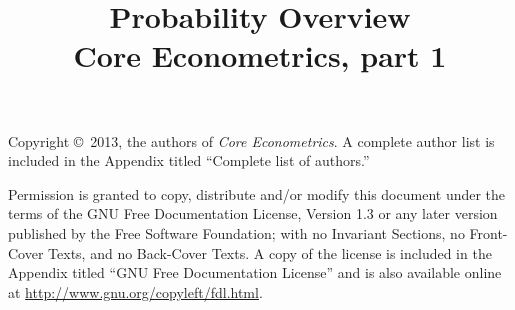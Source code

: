 \documentclass[nohyper]{tufte-handout}
\title[Probability overview]%
{Probability Overview \\
  Core Econometrics, part 1}
\begin{document}
\maketitle

\bigskip\noindent%
Copyright \copyright\ 2013, the authors of \textit{Core Econometrics}.  A
complete author list is included in the Appendix titled ``Complete
list of authors.''

Permission is granted to copy, distribute and/or modify this document
under the terms of the GNU Free Documentation License, Version 1.3 or
any later version published by the Free Software Foundation; with no
Invariant Sections, no Front-Cover Texts, and no Back-Cover Texts.  A
copy of the license is included in the Appendix titled ``GNU Free
Documentation License'' and is also available online at
\url{http://www.gnu.org/copyleft/fdl.html}.

\tableofcontents
\listoftables
\listoffigures






\end{document}
